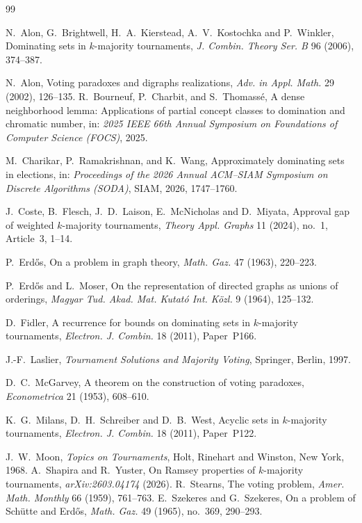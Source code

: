 \documentclass[12pt]{article}
\theoremstyle{remark}
\begin{document}
\begin{thebibliography}{99}

N.~Alon, G.~Brightwell, H.~A.~Kierstead, A.~V.~Kostochka and P.~Winkler,
Dominating sets in $k$-majority tournaments,
\emph{J. Combin. Theory Ser. B} 96 (2006), 374--387.

N.~Alon,
Voting paradoxes and digraphs realizations,
\emph{Adv. in Appl. Math.} 29 (2002), 126--135.
R.~Bourneuf, P.~Charbit, and S.~Thomassé,
A dense neighborhood lemma: Applications of partial concept
classes to domination and chromatic number,
in: \emph{2025 IEEE 66th Annual Symposium on Foundations of
Computer Science (FOCS)}, 2025.

M.~Charikar, P.~Ramakrishnan, and K.~Wang,
Approximately dominating sets in elections,
in: \emph{Proceedings of the 2026 Annual ACM--SIAM Symposium
on Discrete Algorithms (SODA)}, SIAM, 2026, 1747--1760.

J.~Coste, B.~Flesch, J.~D.~Laison, E.~McNicholas and D.~Miyata,
Approval gap of weighted $k$-majority tournaments,
\emph{Theory Appl. Graphs} 11 (2024), no.~1, Article~3, 1--14.

P.~Erd\H{o}s,
On a problem in graph theory,
\emph{Math. Gaz.} 47 (1963), 220--223.

P.~Erd\H{o}s and L.~Moser,
On the representation of directed graphs as unions of orderings,
\emph{Magyar Tud. Akad. Mat. Kutat\'o Int. K\"ozl.} 9 (1964), 125--132.

D.~Fidler,
A recurrence for bounds on dominating sets in $k$-majority tournaments,
\emph{Electron. J. Combin.} 18 (2011), Paper~P166.

J.-F.~Laslier,
\emph{Tournament Solutions and Majority Voting},
Springer, Berlin, 1997.

D.~C.~McGarvey,
A theorem on the construction of voting paradoxes,
\emph{Econometrica} 21 (1953), 608--610.

K.~G.~Milans, D.~H.~Schreiber and D.~B.~West,
Acyclic sets in $k$-majority tournaments,
\emph{Electron. J. Combin.} 18 (2011), Paper~P122.

J.~W.~Moon,
\emph{Topics on Tournaments},
Holt, Rinehart and Winston, New York, 1968.
A.~Shapira and R.~Yuster,
On Ramsey properties of $k$-majority tournaments,
\emph{arXiv:2603.04174} (2026).
R.~Stearns,
The voting problem,
\emph{Amer. Math. Monthly} 66 (1959), 761--763.
E.~Szekeres and G.~Szekeres,
On a problem of Sch\"utte and Erd\H{o}s,
\emph{Math. Gaz.} 49 (1965), no.~369, 290--293.
\end{thebibliography}
\end{document}
